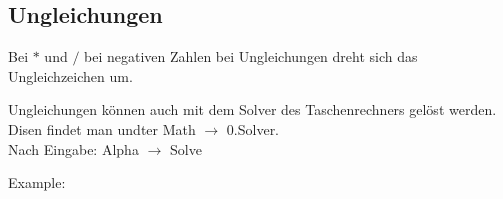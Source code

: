 \newpage
\subsection{Ungleichungen}

\hfill \break
Bei $*$ und $/$ bei negativen Zahlen bei Ungleichungen dreht sich das Ungleichzeichen um.

\hfill \break
Ungleichungen können auch mit dem Solver des Taschenrechners gelöst werden. \\
Disen findet man undter Math $\rightarrow$ 0.Solver.\\
Nach Eingabe: Alpha $\rightarrow$ Solve


\hfill \break
Example:\\
\fboxrule=0.8pt \\


